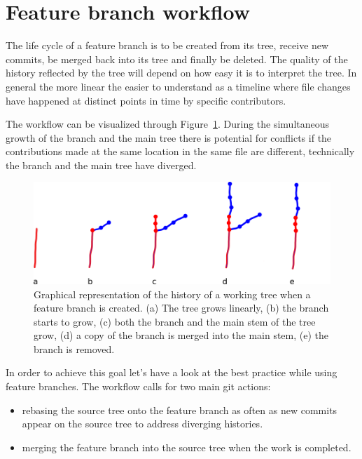 \documentclass[10pt]{article}
\begin{document}
\section{Feature branch workflow}

The life cycle of a feature branch is to be created from its tree, receive new commits, be merged back into its tree and finally be deleted.
The quality of the history reflected by the tree will depend on how easy it is to interpret the tree.
In general the more linear the easier to understand as a timeline where file changes have happened at distinct points in time by specific contributors.

The workflow can be visualized through Figure~\ref{fig:feature-happy-path}. 
During the simultaneous growth of the branch and the main tree there is potential for conflicts if the contributions made at the same location in the same file are different, technically the branch and the main tree have diverged.

\begin{figure}
    \centering
    \includegraphics[width=\textwidth]{images/featurebranch_happy_path.png}
    \caption{Graphical representation of the history of a working tree when a feature branch is created. (a) The tree grows linearly, (b) the branch starts to grow, (c) both the branch and the main stem of the tree grow, (d) a copy of the branch is merged into the main stem, (e) the branch is removed.}
    \label{fig:feature-happy-path}
\end{figure}

In order to achieve this goal let's have a look at the best practice while using feature branches.
The workflow calls for two main git actions:

\begin{itemize}
    \item rebasing the source tree onto the feature branch as often as new commits appear on the source tree to address diverging histories.
    \item merging the feature branch into the source tree when the work is completed.
\end{itemize}
\end{document}
